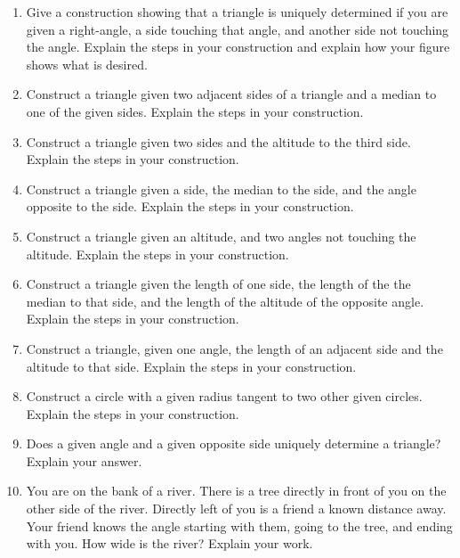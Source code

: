\begin{problems}
\begin{enumerate}
\item Give a construction showing that a triangle is uniquely
  determined if you are given a right-angle, a side touching that
  angle, and another side not touching the angle. Explain the steps in
  your construction and explain how your figure shows what is desired.

\item Construct a triangle given two adjacent sides of a triangle and
  a median to one of the given sides. Explain the steps in your
  construction.

\item Construct a triangle given two sides and the altitude to the
  third side. Explain the steps in your construction.

\item Construct a triangle given a side, the median to the side, and
  the angle opposite to the side. Explain the steps in your
  construction.



\item Construct a triangle given an altitude, and two angles not
  touching the altitude. Explain the steps in your construction.

\item Construct a triangle given the length of one side, the length of
  the the median to that side, and the length of the altitude of the
  opposite angle. Explain the steps in your construction.

\item Construct a triangle, given one angle, the length of an adjacent
  side and the altitude to that side. Explain the steps in your
  construction.

\item Construct a circle with a given radius tangent to two other
  given circles. Explain the steps in your construction.

\item Does a given angle and a given opposite side uniquely determine
  a triangle? Explain your answer.

\item You are on the bank of a river. There is a tree directly in
  front of you on the other side of the river. Directly left of you is
  a friend a known distance away. Your friend knows the angle starting
  with them, going to the tree, and ending with you. How wide is the
  river? Explain your work.


\end{enumerate}
\end{problems}

